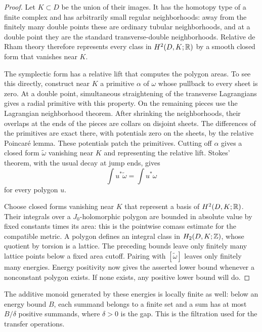 \begin{proof}
Let $K\subset D$ be the union of their images.  It has the homotopy
type of a finite complex and has arbitrarily small regular
neighborhoods: away from the finitely many double points these are
ordinary tubular neighborhoods, and at a double point they are the
standard transverse-double neighborhoods.  Relative de Rham theory
therefore represents every class in $H^2(D,K;\mathbb R)$ by a smooth closed
form that vanishes near $K$.

The symplectic form has a relative lift that computes the polygon
areas.  To see this directly, construct near $K$ a primitive $\alpha$
of $\omega$ whose pullback to every sheet is zero.  At a double point,
simultaneous straightening of the transverse Lagrangians gives a radial
primitive with this property.  On the remaining pieces use the
Lagrangian neighborhood theorem.  After shrinking the neighborhoods,
their overlaps at the ends of the pieces are collars on disjoint
sheets.  The differences of the primitives are exact there, with
potentials zero on the sheets, by the relative Poincar\'e lemma.
These potentials patch the primitives.  Cutting off $\alpha$ gives a
closed form $\widetilde\omega$ vanishing near $K$ and representing the
relative lift.  Stokes' theorem, with the usual decay at jump ends,
gives
\[
 \int u^*\widetilde\omega=\int u^*\omega
\]
for every polygon $u$.

Choose closed forms vanishing near $K$ that represent a basis of
$H^2(D,K;\mathbb R)$.  Their integrals over a $J_0$-holomorphic polygon are
bounded in absolute value by fixed constants times its area: this is
the pointwise comass estimate for the compatible metric.  A polygon
defines an integral class in $H_2(D,K;\mathbb Z)$, whose quotient by torsion
is a lattice.  The preceding bounds leave only finitely many lattice
points below a fixed area cutoff.  Pairing with
$[\widetilde\omega]$ leaves only finitely many energies.  Energy
positivity now gives the asserted lower bound whenever a nonconstant
polygon exists.  If none exists, any positive lower bound will do.
\end{proof}

The additive monoid generated by these energies is locally finite as
well: below an energy bound $B$, each summand belongs to a finite set
and a sum has at most $B/\delta$ positive summands, where $\delta>0$
is the gap.  This is the filtration used for the transfer operations.

